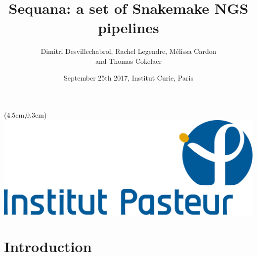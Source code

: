 \documentclass{beamer}
\title[Sequana]{Sequana: a set of Snakemake NGS pipelines}
\author[D.Desvillechabrol \& T.Cokelaer]{Dimitri Desvillechabrol, Rachel Legendre,
    Mélissa Cardon\\ and Thomas Cokelaer}
\date{September 25th 2017, Institut Curie, Paris}
\begin{document}

\begin{frame}[plain]
    \titlepage
    \begin{textblock*}{5cm}(4.5cm,0.3cm)
        \includegraphics[scale=0.09]{images/Institut_Pasteur.png}
    \end{textblock*}
\end{frame}







\section{Introduction}
\end{document}
